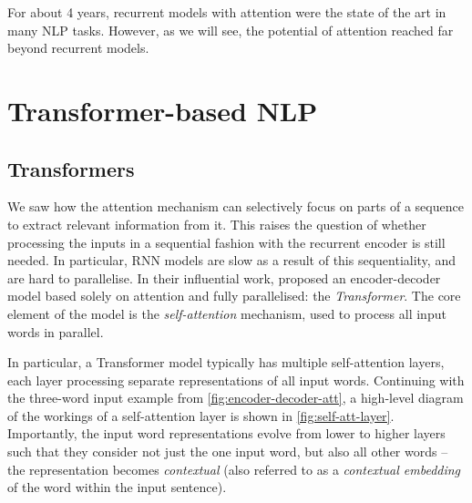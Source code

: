 \documentclass[bsc,frontabs,twoside,singlespacing,parskip,deptreport]{infthesis}
\begin{document}
{{    For about 4 years, recurrent models with attention were the state of the art in many NLP tasks. However, as we will see, the potential of attention reached far beyond recurrent models.
  }

  \section{Transformer-based NLP}{
    \label{sec:Transformer-based-NLP}
    \subsection{Transformers}{
      \label{sec:Transformers}
      We saw how the attention mechanism can selectively focus on parts of a sequence to extract relevant information from it. This raises the question of whether processing the inputs in a sequential fashion with the recurrent encoder is still needed. In particular, RNN models are slow as a result of this sequentiality, and are hard to parallelise. In their influential work, \citet{Vaswani_2017} proposed an encoder-decoder model based solely on attention and fully parallelised: the \textit{Transformer}. The core element of the model is the \textit{self-attention} mechanism, used to process all input words in parallel.

      In particular, a Transformer model typically has multiple self-attention layers, each layer processing separate representations of all input words. Continuing with the three-word input example from \autoref{fig:encoder-decoder-att}, a high-level diagram of the workings of a self-attention layer is shown in \autoref{fig:self-att-layer}. Importantly, the input word representations evolve from lower to higher layers such that they consider not just the one input word, but also all other words -- the representation becomes \textit{contextual} (also referred to as a \textit{contextual embedding} of the word within the input sentence).

}}}
\end{document}

